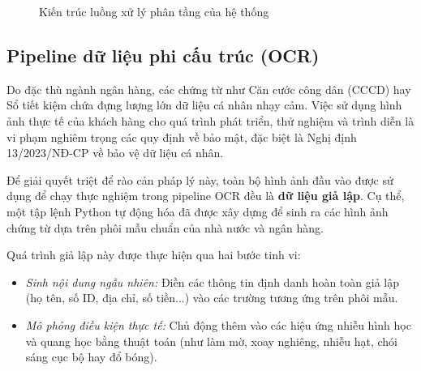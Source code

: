 \begin{figure}[H]
    \caption{Kiến trúc luồng xử lý phân tầng của hệ thống}
    \label{fig:overall_architecture}
\end{figure}





\subsection{Pipeline dữ liệu phi cấu trúc (OCR)}
Do đặc thù ngành ngân hàng, các chứng từ như Căn cước công dân (CCCD) hay Sổ tiết kiệm chứa đựng lượng lớn dữ liệu cá nhân nhạy cảm. Việc sử dụng hình ảnh thực tế của khách hàng cho quá trình phát triển, thử nghiệm và trình diễn là vi phạm nghiêm trọng các quy định về bảo mật, đặc biệt là Nghị định 13/2023/NĐ-CP về bảo vệ dữ liệu cá nhân.

Để giải quyết triệt để rào cản pháp lý này, toàn bộ hình ảnh đầu vào được sử dụng để chạy thực nghiệm trong pipeline OCR đều là \textbf{dữ liệu giả lập}. Cụ thể, một tập lệnh Python tự động hóa đã được xây dựng để sinh ra các hình ảnh chứng từ dựa trên phôi mẫu chuẩn của nhà nước và ngân hàng. 

Quá trình giả lập này được thực hiện qua hai bước tinh vi:
\begin{itemize}
    \item \textit{Sinh nội dung ngẫu nhiên:} Điền các thông tin định danh hoàn toàn giả lập (họ tên, số ID, địa chỉ, số tiền...) vào các trường tương ứng trên phôi mẫu.
    \item \textit{Mô phỏng điều kiện thực tế:} Chủ động thêm vào các hiệu ứng nhiễu hình học và quang học bằng thuật toán (như làm mờ, xoay nghiêng, nhiễu hạt, chói sáng cục bộ hay đổ bóng).
\end{itemize}


